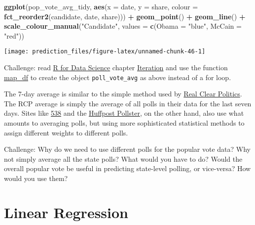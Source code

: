 \documentclass[]{book}
\newenvironment{Shaded}{\begin{snugshade}}{\end{snugshade}}
\newcommand{\KeywordTok}[1]{\textcolor[rgb]{0.13,0.29,0.53}{\textbf{#1}}}
\newcommand{\DataTypeTok}[1]{\textcolor[rgb]{0.13,0.29,0.53}{#1}}
\newcommand{\StringTok}[1]{\textcolor[rgb]{0.31,0.60,0.02}{#1}}
\newcommand{\OperatorTok}[1]{\textcolor[rgb]{0.81,0.36,0.00}{\textbf{#1}}}
\newcommand{\NormalTok}[1]{#1}
\theoremstyle{definition}
\theoremstyle{definition}
\theoremstyle{definition}
\theoremstyle{remark}
\begin{document}
\begin{Shaded}
\begin{Highlighting}[]
\KeywordTok{ggplot}\NormalTok{(pop_vote_avg_tidy, }\KeywordTok{aes}\NormalTok{(}\DataTypeTok{x =}\NormalTok{ date, }\DataTypeTok{y =}\NormalTok{ share,}
                              \DataTypeTok{colour =} \KeywordTok{fct_reorder2}\NormalTok{(candidate, date, share))) }\OperatorTok{+}
\StringTok{  }\KeywordTok{geom_point}\NormalTok{() }\OperatorTok{+}
\StringTok{  }\KeywordTok{geom_line}\NormalTok{() }\OperatorTok{+}
\StringTok{  }\KeywordTok{scale_colour_manual}\NormalTok{(}\StringTok{"Candidate"}\NormalTok{,}
                      \DataTypeTok{values =} \KeywordTok{c}\NormalTok{(}\DataTypeTok{Obama =} \StringTok{"blue"}\NormalTok{, }\DataTypeTok{McCain =} \StringTok{"red"}\NormalTok{))}
\end{Highlighting}
\end{Shaded}

\begin{center}\texttt{[image: prediction\_files/figure-latex/unnamed-chunk-46-1]} \end{center}

Challenge: read \href{http://r4ds.had.co.nz/}{R for Data Science}
chapter
\href{http://r4ds.had.co.nz/iteration.html\#the-map-functions}{Iteration}
and use the function
\href{https://www.rdocumentation.org/packages/purrr/topics/map_df}{map\_df}
to create the object \texttt{poll\_vote\_avg} as above instead of a for
loop.

The 7-day average is similar to the simple method used by
\href{http://www.realclearpolitics.com/epolls/2016/president/us/general_election_trump_vs_clinton-5491.html}{Real
Clear Politics}. The RCP average is simply the average of all polls in
their data for the last seven days. Sites like
\href{https://fivethirtyeight.com}{538} and the
\href{http://elections.huffingtonpost.com/pollster}{Huffpost Pollster},
on the other hand, also use what amounts to averaging polls, but using
more sophisticated statistical methods to assign different weights to
different polls.

Challenge: Why do we need to use different polls for the popular vote
data? Why not simply average all the state polls? What would you have to
do? Would the overall popular vote be useful in predicting state-level
polling, or vice-versa? How would you use them?

\section{Linear Regression}\label{linear-regression}
\end{document}
